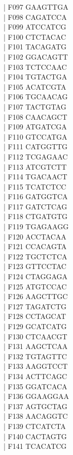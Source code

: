 \documentclass[titlepage,10pt,a4paper,uplatex]{jsbook}
\newenvironment{content}{\begin{shaded}\vspace{-1em}\raggedright\ttfamily\footnotesize\setlength{\baselineskip}{1.4em}}{\end{shaded}\vspace{-1em}}
\begin{document}
\begin{content}
| F097	GAAGTTGA\\
| F098	CAGATCCA\\
| F099	ATCCATCG\\
| F100	CTCTACAC\\
| F101	TACAGATG\\
| F102	GGACAGTT\\
| F103	TCTCCAAC\\
| F104	TGTACTGA\\
| F105	ACATCGTA\\
| F106	TGCAACAG\\
| F107	TACTGTAG\\
| F108	CAACAGCT\\
| F109	ATGATCGA\\
| F110	GTCCATGA\\
| F111	CATGGTTG\\
| F112	TCGAGAAC\\
| F113	ATCGTCTT\\
| F114	TGACAACT\\
| F115	TCATCTCC\\
| F116	GATGGTCA\\
| F117	GATCTCAG\\
| F118	CTGATGTG\\
| F119	TGAGAAGG\\
| F120	ACCTACAA\\
| F121	CCACAGTA\\
| F122	TGCTCTCA\\
| F123	GTTCCTAC\\
| F124	CTAGGAGA\\
| F125	ATGTCCAC\\
| F126	AAGCTTGC\\
| F127	TAGATCTG\\
| F128	CCTAGCAT\\
| F129	GCATCATG\\
| F130	CTCAACGT\\
| F131	AAGCTCAA\\
| F132	TGTAGTTC\\
| F133	AAGGTCCT\\
| F134	ACTTCAGC\\
| F135	GGATCACA\\
| F136	GGAAGGAA\\
| F137	AGTGCTAG\\
| F138	AACAGGTC\\
| F139	CTCATCTA\\
| F140	CACTAGTG\\
| F141	TCACATCG\\

\end{content}
\end{document}
